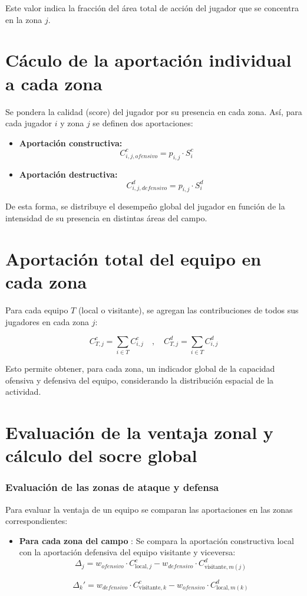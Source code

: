 Este valor indica la fracción del área total de acción del jugador que se concentra en la
zona $j$.

\section{Cáculo de la aportación individual a cada zona}
Se pondera la calidad (score) del jugador por su presencia en cada zona. Así, para
cada jugador $i$ y zona $j$ se definen dos aportaciones:

\begin{itemize}
    \item \textbf{Aportación constructiva:} 
    \[ C^c_{i,j,ofensivo} = p_{i,j} \cdot S_i^c \quad \]
    \item \textbf{Aportación destructiva:}
    \[ \quad C^d_{i,j, defensivo} = p_{i,j} \cdot S_i^d \]
\end{itemize}

De esta forma, se distribuye el desempeño global del jugador en función de la intensidad
de su presencia en distintas áreas del campo.

\section{Aportación total del equipo en cada zona}
Para cada equipo $T$ (local o visitante), se agregan las contribuciones de todos sus
jugadores en cada zona $j$:

\[ C^c_{T,j} = \sum_{i \in T} C^c_{i,j} \quad , \quad C^d_{T,j} = \sum_{i \in T} C^d_{i,j} \]

Esto permite obtener, para cada zona, un indicador global de la capacidad ofensiva y
defensiva del equipo, considerando la distribución espacial de la actividad.

\section{Evaluación de la ventaja zonal y cálculo del socre global}
\subsubsection*{Evaluación de las zonas de ataque y defensa}

Para evaluar la ventaja de un equipo se comparan las aportaciones en las zonas correspondientes:

\begin{itemize}
    \item \textbf{Para cada zona del campo} : Se compara la aportación constructiva local con la aportación defensiva del equipo visitante y viceversa:
    \[ \Delta_j = w_{ofensivo} \cdot C^c_{\text{local},j} - w_{defensivo} \cdot C^d_{\text{visitante},m(j)} \]
    
    \[ \Delta_k' = w_{defensivo} \cdot C^c_{\text{visitante},k} - w_{ofensivo} \cdot C^d_{\text{local},m(k)} \]
    
\end{itemize}

